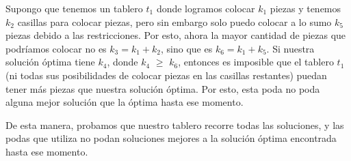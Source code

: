 Supongo que tenemos un tablero $t_1$ donde logramos colocar $k_1$ piezas y tenemos $k_2$ casillas para colocar piezas, pero sin embargo solo puedo colocar a lo sumo $k_5$ piezas debido a las restricciones. Por esto, ahora la mayor cantidad de piezas que podríamos colocar no es $k_3 = k_1 + k_2$, sino que es $k_6 = k_1 + k_5$. Si nuestra solución óptima tiene $k_4$, donde $k_4$ $\geq$ $k_6$, entonces es imposible que el tablero $t_1$ (ni todas sus posibilidades de colocar piezas en las casillas restantes) puedan tener más piezas que nuestra solución óptima. Por esto, esta poda no poda alguna mejor solución que la óptima hasta ese momento.

De esta manera, probamos que nuestro tablero recorre todas las soluciones, y las podas que utiliza no podan soluciones mejores a la solución óptima encontrada hasta ese momento.